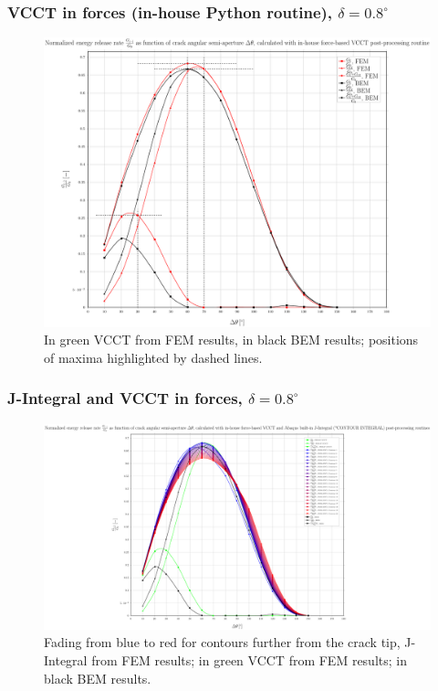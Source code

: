 \documentclass[first,firstsupp,lastsupp,handout,last,hyperref,table]{ETHclass}
\begin{document}
\begin{frame}
\frametitle{\small VCCT in forces (in-house Python routine), $\delta=0.8^{\circ}$}
\vspace{-0.5cm}
\centering
\captionsetup[figure]{font=scriptsize,labelfont=scriptsize}
\begin{figure}[!h]
\centering
\includegraphics[height=0.7\textheight]{2017-07-10_AbqRunSummary_SmallStrainD08_M-F-VCCT_Summary.pdf}
  \caption{\scriptsize In green VCCT from FEM results, in black BEM results; positions of maxima highlighted by dashed lines.}
  \label{fig:res1}
\end{figure}
\end{frame}

\begin{frame}
\frametitle{\small J-Integral and VCCT in forces, $\delta=0.8^{\circ}$}
\vspace{-0.5cm}
\centering
\captionsetup[figure]{font=scriptsize,labelfont=scriptsize}
\begin{figure}[!h]
\centering
\includegraphics[height=0.7\textheight]{2017-07-10_AbqRunSummary_SmallStrainD08_F-VCCT-JINT_Summary.pdf}
  \caption{\scriptsize Fading from blue to red for contours further from the crack tip, J-Integral from FEM results; in green VCCT from FEM results; in black BEM results.}
  \label{fig:res1}
\end{figure}
\end{frame}
\end{document}
